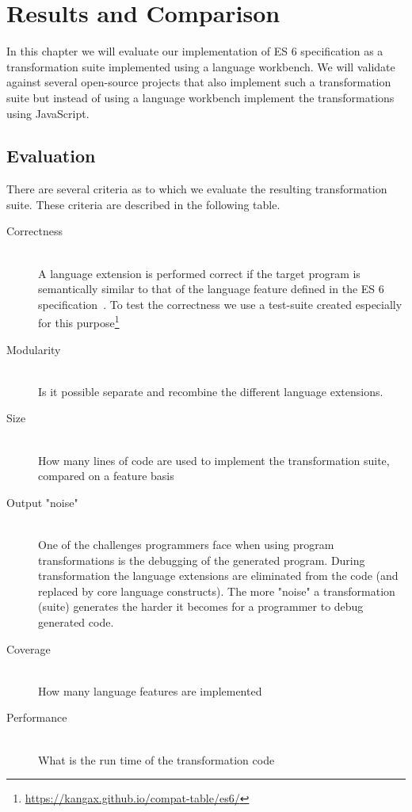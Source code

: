 
\chapter{Results and Comparison} %

\label{Chapter6}


In this chapter we will evaluate our implementation of ES 6 specification as a transformation suite implemented using a language workbench. We will validate against several open-source projects that also implement such a transformation suite but instead of using a language workbench implement the transformations using JavaScript.

\section{Evaluation}

There are several criteria as to which we evaluate the resulting transformation suite. These criteria are described in the following table.

\begin{description}
\item[Correctness] \hfill \\ A language extension is performed correct if the target program is semantically similar to that of the language feature defined in the ES 6 specification~\cite{SpecJS}. To test the correctness we use a test-suite created especially for this purpose\footnote{\url{https://kangax.github.io/compat-table/es6/}}
\item[Modularity] \hfill \\ Is it possible separate and recombine the different language extensions.
\item[Size] \hfill \\ How many lines of code are used to implement the transformation suite, compared on a feature basis
\item[Output "noise"] \hfill \\ One of the challenges programmers face when using program transformations is the debugging of the generated program. During transformation the language extensions are eliminated from the code (and replaced by core language constructs). The more "noise" a transformation (suite) generates the harder it becomes for a programmer to debug generated code.
\item[Coverage] \hfill \\ How many language features are implemented
\item[Performance] \hfill \\ What is the run time of the transformation code
\end{description}


